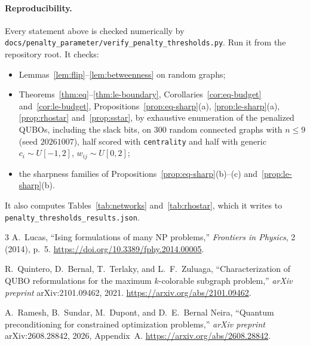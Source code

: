 \documentclass[11pt]{article}
\begin{document}
\paragraph{Reproducibility.}
Every statement above is checked numerically by
\nolinkurl{docs/penalty_parameter/verify_penalty_thresholds.py}. Run it from the
repository root. It checks:
\begin{itemize}
\item Lemmas~\ref{lem:flip}--\ref{lem:betweenness} on random graphs;
\item Theorems~\ref{thm:eq}--\ref{thm:le-boundary},
Corollaries~\ref{cor:eq-budget} and~\ref{cor:le-budget},
Propositions~\ref{prop:eq-sharp}(a), \ref{prop:le-sharp}(a), \ref{prop:rhostar}
and~\ref{prop:sstar}, by exhaustive enumeration of the penalized QUBOs, including
the slack bits, on $300$ random connected graphs with $n\le9$ (seed
$20261007$), half scored with \texttt{centrality} and half with generic
$c_i\sim U[-1,2]$, $w_{ij}\sim U[0,2]$;
\item the sharpness families of Propositions~\ref{prop:eq-sharp}(b)--(c)
and~\ref{prop:le-sharp}(b).
\end{itemize}
It also computes Tables~\ref{tab:networks} and~\ref{tab:rhostar}, which it writes
to \texttt{penalty\_thresholds\_results.json}.

\begin{thebibliography}{3}
A.~Lucas, ``Ising formulations of many NP problems,'' \emph{Frontiers in Physics},
2 (2014), p.~5.
\url{https://doi.org/10.3389/fphy.2014.00005}.

R.~Quintero, D.~Bernal, T.~Terlaky, and L.~F.~Zuluaga,
``Characterization of QUBO reformulations for the maximum $k$-colorable subgraph
problem,'' \emph{arXiv preprint} arXiv:2101.09462, 2021.
\url{https://arxiv.org/abs/2101.09462}.

A.~Ramesh, B.~Sundar, M.~Dupont, and D.~E.~Bernal Neira,
``Quantum preconditioning for constrained optimization problems,''
\emph{arXiv preprint} arXiv:2608.28842, 2026, Appendix~A.
\url{https://arxiv.org/abs/2608.28842}.
\end{thebibliography}
\end{document}
